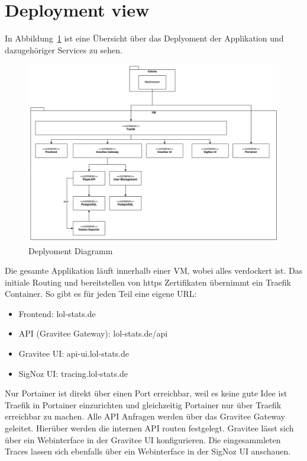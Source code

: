 \section{Deployment view}

In Abbildung~\ref{fig:deployment-diagram} ist eine Übersicht über das Deplyoment der Applikation und dazugehöriger
Services zu sehen.
\begin{figure}
    \centering
    \includegraphics[width=\textwidth]{images/cdc-08-deployment-diagram.drawio}
    \caption{Deplyoment Diagramm}
    \label{fig:deployment-diagram}
\end{figure}

Die gesamte Applikation läuft innerhalb einer VM, wobei alles verdockert ist.
Das initiale Routing und bereitstellen von https Zertifikaten übernimmt ein Traefik Container.
So gibt es für jeden Teil eine eigene URL:
\begin{itemize}
    \item Frontend: lol-stats.de
    \item API (Gravitee Gateway): lol-stats.de/api
    \item Gravitee UI: api-ui.lol-stats.de
    \item SigNoz UI: tracing.lol-stats.de
\end{itemize}

Nur Portainer ist direkt über einen Port erreichbar, weil es keine gute Idee ist Traefik in Portainer einzurichten
und gleichzeitig Portainer nur über Traefik erreichbar zu machen.
Alle API Anfragen werden über das Gravitee Gateway geleitet.
Hierüber werden die internen API routen festgelegt.
Gravitee lässt sich über ein Webinterface in der Gravitee UI konfigurieren.
Die eingesammleten Traces lassen sich ebenfalls über ein Webinterface in der SigNoz UI anschauen.